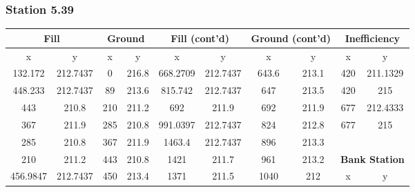 \subsubsection{Station 5.39}
\begin{center}
\begin{tabular}{|cccc||cccc||cc|} 
    \hline
    \multicolumn{2}{|c}{\textbf{Fill }} & \multicolumn{2}{c||}{\textbf{Ground }} & \multicolumn{2}{c}{\textbf{Fill (cont'd)}} & \multicolumn{2}{c||}{\textbf{Ground (cont'd)}} & \multicolumn{2}{c|}{\textbf{Inefficiency }}    \\ 
    \hline
    x        & y                        & x     & y                             & x        & y                       & x     & y                             & x        & y                                   \\
    132.172  & 212.7437                 & 0     & 216.8                         & 668.2709 & 212.7437                & 643.6 & 213.1                         & 420      & 211.1329                            \\
    448.233  & 212.7437                 & 89    & 213.6                         & 815.742  & 212.7437                & 647   & 213.5                         & 420      & 215                                 \\
    443      & 210.8                    & 210   & 211.2                         & 692      & 211.9                   & 692   & 211.9                         & 677      & 212.4333                            \\
    367      & 211.9                    & 285   & 210.8                         & 991.0397 & 212.7437                & 824   & 212.8                         & 677      & 215                                 \\
    285      & 210.8                    & 367   & 211.9                         & 1463.4   & 212.7437                & 896   & 213.3                         &          &                                     \\
    210      & 211.2                    & 443   & 210.8                         & 1421     & 211.7                   & 961   & 213.2                         & \multicolumn{2}{c|}{\textbf{Bank Station }}    \\ 
    \cline{9-10}
    456.9847 & 212.7437                 & 450   & 213.4                         & 1371     & 211.5                   & 1040  & 212                           & x        & y                                   \\

\end{tabular}
\end{center}
